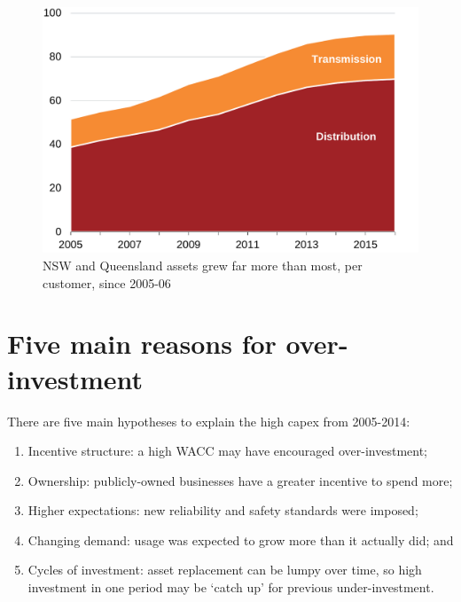 \documentclass[FrontPage]{grattan}
\begin{document}
\begin{figure}
\caption{NSW and Queensland assets grew far more than most, per customer, since 2005-06}\label{fig:RAB-per-customer-absolute-and-percent}
\includegraphics[page=25]{atlas/Charts.pdf}
\end{figure}
 


\section{Five main reasons for over-investment}\label{sec:reasons-why}
There are five main hypotheses to explain the high capex from 2005-2014:
\begin{enumerate}
 \item Incentive structure: a high WACC may have encouraged over-investment;
 \item Ownership: publicly-owned businesses have a greater incentive to spend more;
 \item Higher expectations: new reliability and safety standards were imposed;
 \item Changing demand: usage was expected to grow more than it actually did; and
 \item Cycles of investment: asset replacement can be lumpy over time, so high investment in one period may be `catch up' for previous under-investment.
\end{enumerate}
\end{document}
